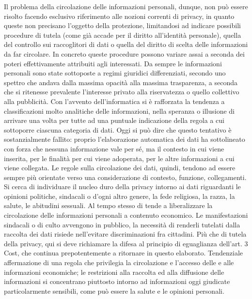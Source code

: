 Il problema della circolazione delle informazioni personali, dunque, non può essere risolto facendo esclusivo riferimento alle nozioni correnti di privacy, in quanto queste non precisano l’oggetto della protezione, limitandosi ad indicare possibili procedure di tutela (come già accade per il diritto all’identità personale), quella del controllo sui raccoglitori di dati o quella del diritto di scelta delle informazioni da far circolare.
In concreto queste procedure possono variare assai a seconda dei poteri effettivamente attribuiti agli interessati.
Da sempre le informazioni personali sono state sottoposte a regimi giuridici differenziati, secondo uno spettro che andava dalla massima opacità alla massima trasparenza, a seconda che si ritenesse prevalente l’interesse privato alla riservatezza o quello collettivo alla pubblicità. Con l’avvento dell’informatica si è rafforzata la tendenza a classificazioni molto analitiche delle informazioni, nella speranza o illusione di arrivare una volta per tutte ad una puntuale indicazione della regola a cui sottoporre ciascuna categoria di dati. Oggi si può dire che questo tentativo è sostanzialmente fallito: proprio l’elaborazione automatica dei dati ha sottolineato con forza che nessuna informazione vale per sé, ma il contesto in cui viene inserita, per le finalità per cui viene adoperata, per le altre informazioni a cui viene collegata. Le regole sulla circolazione dei dati, quindi, tendono ad essere sempre più orientate verso una considerazione di contesto, funzione, collegamenti.
Si cerca di individuare il nucleo duro della privacy intorno ai dati riguardanti le opinioni politiche, sindacali o d’ogni altro genere, la fede religiosa, la razza, la salute, le abitudini sessuali. Al tempo stesso di tende a liberalizzare la circolazione delle informazioni personali a contenuto economico.
Le manifestazioni sindacali o di culto avvengono in pubblico, la necessità di renderli tutelati dalla raccolta dei dati risiede nell’evitare discriminazioni fra cittadini. Più che di tutela della privacy, qui si deve richiamare la difesa al principio di eguaglianza dell’art. 3 Cost, che continua prepotentemente a ritornare in questo elaborato.
Tendenziale affermazione di una regola che privilegia la circolazione e l’accesso delle e alle informazioni economiche; le restrizioni alla raccolta ed alla diffusione delle informazioni si concentrano piuttosto intorno ad informazioni oggi giudicate particolarmente sensibili, come può essere la salute e le opinioni personali. 


